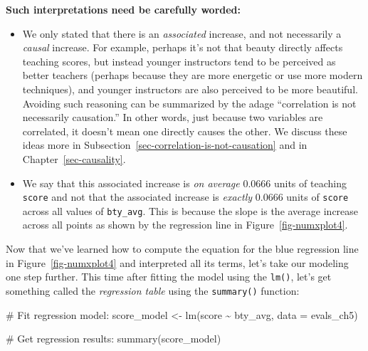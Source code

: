 \documentclass[
  letterpaper,
  DIV=11,
  numbers=noendperiod]{scrreprt}
\newenvironment{Shaded}{\begin{snugshade}}{\end{snugshade}}
\newcommand{\AttributeTok}[1]{\textcolor[rgb]{0.40,0.45,0.13}{#1}}
\newcommand{\CommentTok}[1]{\textcolor[rgb]{0.37,0.37,0.37}{#1}}
\newcommand{\FunctionTok}[1]{\textcolor[rgb]{0.28,0.35,0.67}{#1}}
\newcommand{\NormalTok}[1]{\textcolor[rgb]{0.00,0.23,0.31}{#1}}
\newcommand{\OtherTok}[1]{\textcolor[rgb]{0.00,0.23,0.31}{#1}}
\newcommand{\SpecialCharTok}[1]{\textcolor[rgb]{0.37,0.37,0.37}{#1}}
\theoremstyle{definition}
\theoremstyle{remark}
\begin{document}
\begin{tcolorbox}[enhanced jigsaw, colback=white, toprule=.15mm, bottomrule=.15mm, titlerule=0mm, title=\textcolor{quarto-callout-important-color}{\faExclamation}\hspace{0.5em}{Important}, leftrule=.75mm, arc=.35mm, left=2mm, colframe=quarto-callout-important-color-frame, coltitle=black, opacitybacktitle=0.6, bottomtitle=1mm, colbacktitle=quarto-callout-important-color!10!white, opacityback=0, toptitle=1mm, rightrule=.15mm, breakable]

\textbf{Such interpretations need be carefully worded:}

\begin{itemize}
\item
  We only stated that there is an \emph{associated} increase, and not
  necessarily a \emph{causal} increase. For example, perhaps it's not
  that beauty directly affects teaching scores, but instead younger
  instructors tend to be perceived as better teachers (perhaps because
  they are more energetic or use more modern techniques), and younger
  instructors are also perceived to be more beautiful. Avoiding such
  reasoning can be summarized by the adage ``correlation is not
  necessarily causation.'' In other words, just because two variables
  are correlated, it doesn't mean one directly causes the other. We
  discuss these ideas more in
  Subsection~\ref{sec-correlation-is-not-causation} and in
  Chapter~\ref{sec-causality}.
\item
  We say that this associated increase is \emph{on average} 0.0666 units
  of teaching \texttt{score} and not that the associated increase is
  \emph{exactly} 0.0666 units of \texttt{score} across all values of
  \texttt{bty\_avg}. This is because the slope is the average increase
  across all points as shown by the regression line in
  Figure~\ref{fig-numxplot4}.
\end{itemize}

\end{tcolorbox}

Now that we've learned how to compute the equation for the blue
regression line in Figure~\ref{fig-numxplot4} and interpreted all its
terms, let's take our modeling one step further. This time after fitting
the model using the \texttt{lm()}, let's get something called the
\emph{regression table} using the \texttt{summary()} function:

\begin{Shaded}
\begin{Highlighting}[]
\CommentTok{\# Fit regression model:}
\NormalTok{score\_model }\OtherTok{\textless{}{-}} \FunctionTok{lm}\NormalTok{(score }\SpecialCharTok{\textasciitilde{}}\NormalTok{ bty\_avg, }\AttributeTok{data =}\NormalTok{ evals\_ch5)}

\CommentTok{\# Get regression results:}
\FunctionTok{summary}\NormalTok{(score\_model)}
\end{Highlighting}
\end{Shaded}
\end{document}
